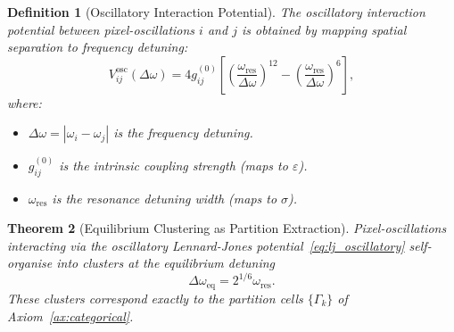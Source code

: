 \documentclass[11pt,twocolumn,a4paper]{article}
\newtheorem{theorem}{Theorem}[section]
\newtheorem{definition}[theorem]{Definition}
\begin{document}
\begin{definition}[Oscillatory Interaction Potential]\label{def:osc_potential}
The oscillatory interaction potential between pixel-oscillations $i$ and $j$ is obtained by mapping spatial separation to frequency detuning:
\begin{equation}
    V_{ij}^{\text{osc}}(\Delta\omega) = 4 g_{ij}^{(0)} \left[ \left(\frac{\omega_{\text{res}}}{\Delta\omega}\right)^{12} - \left(\frac{\omega_{\text{res}}}{\Delta\omega}\right)^{6} \right],
    \label{eq:lj_oscillatory}
\end{equation}
where:
\begin{itemize}[leftmargin=2em]
    \item $\Delta\omega = |\omega_i - \omega_j|$ is the frequency detuning.
    \item $g_{ij}^{(0)}$ is the intrinsic coupling strength (maps to $\varepsilon$).
    \item $\omega_{\text{res}}$ is the resonance detuning width (maps to $\sigma$).
\end{itemize}
\end{definition}

\begin{theorem}[Equilibrium Clustering as Partition Extraction]\label{thm:clustering}
Pixel-oscillations interacting via the oscillatory Lennard-Jones potential~\eqref{eq:lj_oscillatory} self-organise into clusters at the equilibrium detuning
\begin{equation}
    \Delta\omega_{\text{eq}} = 2^{1/6} \omega_{\text{res}}.
    \label{eq:equilibrium_detuning}
\end{equation}
These clusters correspond exactly to the partition cells $\{\Gamma_k\}$ of Axiom~\ref{ax:categorical}.
\end{theorem}
\end{document}
